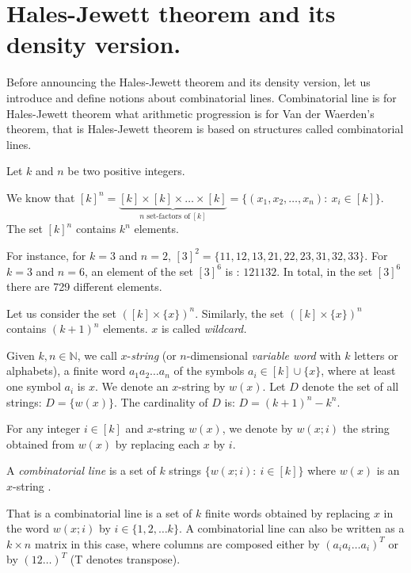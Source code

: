 \section{Hales-Jewett theorem and its density version.} \label{hjt}

Before announcing the Hales-Jewett theorem and its density version, let us introduce and define notions about combinatorial lines.  Combinatorial line is for Hales-Jewett theorem what arithmetic progression is for Van der Waerden's theorem, that is Hales-Jewett theorem is based on structures called combinatorial lines.

Let $k$ and $n$  be two positive integers. 

We know that $[k]^n= \underbrace{[k] \times [k] \times \ldots \times [k]}_{n \text{ set-factors  of}\  [k]}=\{(x_1,x_2,\ldots, x_n):\ x_i \in [k] \}.$ The set $[k]^n$ contains $k^n$ elements.

For instance, for $k=3$ and $n=2$, $[3]^2=\{11,12,13,21,22,23,31,32,33\}.$ For $k=3$ and $n=6$, an element of the set $[3]^6$ is : $121132.$ In total, in the set $[3]^6$ there are  729 different elements.

Let us consider the set $([k]\times \{x\})^n.$ Similarly, the set $([k]\times \{x\})^n$ contains $(k+1)^n$ elements. $x$ is called \textit{wildcard.}



Given ${k,n\in{\mathbb N}}$, we call $x$-\textit{string} (or ${n}$-dimensional \textit{variable word} with ${k}$ letters or alphabets),  a finite word $a_1a_2\ldots a_n$ of the symbols
$a_i \in [k] \cup \{x\}$, where at least one symbol $a_i$ is $x.$ We denote an $x$-string by $w(x)$. Let $D$ denote  the set of all strings: $D=\{w(x)\}$. The cardinality of $D$ is: $D=(k+1)^n-k^n.$ 

For any integer $i \in [k]$ and $x$-string $w(x)$, we  denote by $w(x;i)$ the string obtained from $w(x)$ by replacing each $x$ by $i.$
 \begin{defn}
A \textit{combinatorial line} is a set of $k$ strings $\{w(x;i): \  i\in [k] \}$ where $w(x)$ is an $x$-string %
.\end{defn}
 That is a combinatorial line is a set of $k$ finite words obtained by replacing $x$ in the word $w(x;i)$ by $i \in \{1,2, \ldots k\}.$ A combinatorial line can also be written as a $k \times n$ matrix in this case, where columns are composed either by $(a_ia_i\ldots a_i)^T$ or by  $(12\ldots )^T$ (T denotes transpose).

